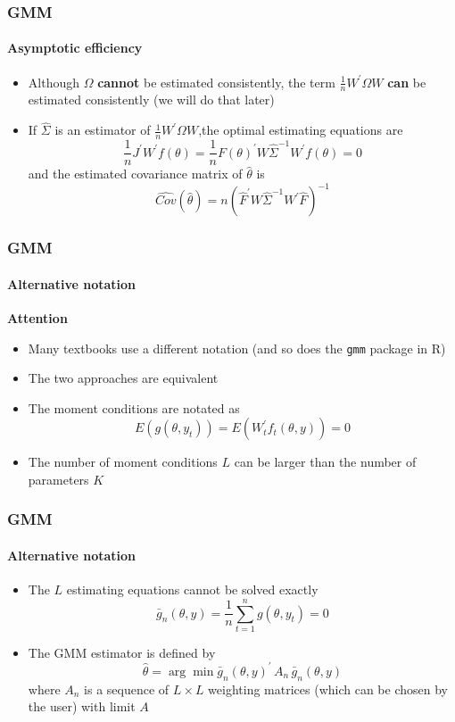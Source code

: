 \documentclass{beamer}
\begin{document}
\begin{frame}\frametitle{GMM}\framesubtitle{Asymptotic efficiency}
\begin{itemize}
    \item Although $\Omega $ \textbf{cannot} be estimated consistently, the term $\frac{1}{n}W^{\prime }\Omega W$ \textbf{can} be estimated consistently (we will do that later)
    \item If $\hat{\Sigma}$ is an estimator of $\frac{1}{n}W^{\prime }\Omega W$,the optimal estimating equations are
    \begin{equation*}
    \frac{1}{n}J^{\prime }W^{\prime }f(\theta )=\frac{1}{n}F(\theta )^{\prime }W \hat{\Sigma}^{-1}W^{\prime }f(\theta )=0
    \end{equation*}
    and the estimated covariance matrix of $\hat{\theta}$ is%
    \begin{equation*}
    \widehat{Cov}(\hat{\theta})=n\left( \hat{F}^{\prime }W\hat{\Sigma}^{-1}W^{\prime }\hat{F}\right) ^{-1}
    \end{equation*}
\end{itemize}
\end{frame}


\begin{frame}\frametitle{GMM}\framesubtitle{Alternative notation}
\textbf{Attention}
\begin{itemize}
    \item Many textbooks use a different notation \newline
        (and so does the \texttt{gmm} package in R)
    \item The two approaches are equivalent
    \item The moment conditions are notated as
    \begin{equation*}
    E\left( g\left( \theta ,y_{t}\right) \right) =E\left( W_{t}^{\prime}f_{t}\left( \theta ,y\right) \right) =0
    \end{equation*}
    \item The number of moment conditions $L$ can be larger than the number of parameters $K$
\end{itemize}
\end{frame}


\begin{frame}\frametitle{GMM}\framesubtitle{Alternative notation}
\begin{itemize}
    \item The $L$ estimating equations cannot be solved exactly
    \begin{equation*}
    \bar{g}_{n}(\theta ,y)=\frac{1}{n}\sum_{t=1}^{n}g(\theta ,y_{t})=0
    \end{equation*}
    \item The GMM estimator is defined by
    \begin{equation*}
    \hat{\theta}=\arg \min \bar{g}_{n}(\theta ,y)^{\prime }\,A_{n}\,\bar{g}_{n}(\theta ,y)
    \end{equation*}
    where $A_{n}$ is a sequence of $L\times L$ weighting matrices \newline
    (which can be chosen by the user) with limit $A$
\end{itemize}
\end{frame}
\end{document}

